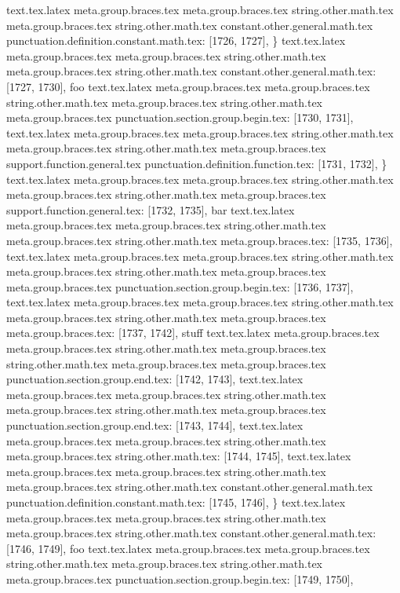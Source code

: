 {{{{{{{{{{{{{{{{{{{{{{{{{{{{{{{{{{{{{{{{{{{{}
text.tex.latex meta.group.braces.tex meta.group.braces.tex string.other.math.tex meta.group.braces.tex string.other.math.tex constant.other.general.math.tex punctuation.definition.constant.math.tex: [1726, 1727], {\}
text.tex.latex meta.group.braces.tex meta.group.braces.tex string.other.math.tex meta.group.braces.tex string.other.math.tex constant.other.general.math.tex: [1727, 1730], {foo}
text.tex.latex meta.group.braces.tex meta.group.braces.tex string.other.math.tex meta.group.braces.tex string.other.math.tex meta.group.braces.tex punctuation.section.group.begin.tex: [1730, 1731], {{}
text.tex.latex meta.group.braces.tex meta.group.braces.tex string.other.math.tex meta.group.braces.tex string.other.math.tex meta.group.braces.tex support.function.general.tex punctuation.definition.function.tex: [1731, 1732], {\}
text.tex.latex meta.group.braces.tex meta.group.braces.tex string.other.math.tex meta.group.braces.tex string.other.math.tex meta.group.braces.tex support.function.general.tex: [1732, 1735], {bar}
text.tex.latex meta.group.braces.tex meta.group.braces.tex string.other.math.tex meta.group.braces.tex string.other.math.tex meta.group.braces.tex: [1735, 1736], { }
text.tex.latex meta.group.braces.tex meta.group.braces.tex string.other.math.tex meta.group.braces.tex string.other.math.tex meta.group.braces.tex meta.group.braces.tex punctuation.section.group.begin.tex: [1736, 1737], {{}
text.tex.latex meta.group.braces.tex meta.group.braces.tex string.other.math.tex meta.group.braces.tex string.other.math.tex meta.group.braces.tex meta.group.braces.tex: [1737, 1742], {stuff}
text.tex.latex meta.group.braces.tex meta.group.braces.tex string.other.math.tex meta.group.braces.tex string.other.math.tex meta.group.braces.tex meta.group.braces.tex punctuation.section.group.end.tex: [1742, 1743], {}}
text.tex.latex meta.group.braces.tex meta.group.braces.tex string.other.math.tex meta.group.braces.tex string.other.math.tex meta.group.braces.tex punctuation.section.group.end.tex: [1743, 1744], {}}
text.tex.latex meta.group.braces.tex meta.group.braces.tex string.other.math.tex meta.group.braces.tex string.other.math.tex: [1744, 1745], {
}
text.tex.latex meta.group.braces.tex meta.group.braces.tex string.other.math.tex meta.group.braces.tex string.other.math.tex constant.other.general.math.tex punctuation.definition.constant.math.tex: [1745, 1746], {\}
text.tex.latex meta.group.braces.tex meta.group.braces.tex string.other.math.tex meta.group.braces.tex string.other.math.tex constant.other.general.math.tex: [1746, 1749], {foo}
text.tex.latex meta.group.braces.tex meta.group.braces.tex string.other.math.tex meta.group.braces.tex string.other.math.tex meta.group.braces.tex punctuation.section.group.begin.tex: [1749, 1750], {{}
}}}}}}}}}}}}}}}}}}}}}}}}}}}}}}}}}}}}}}}}}}}}}}}
